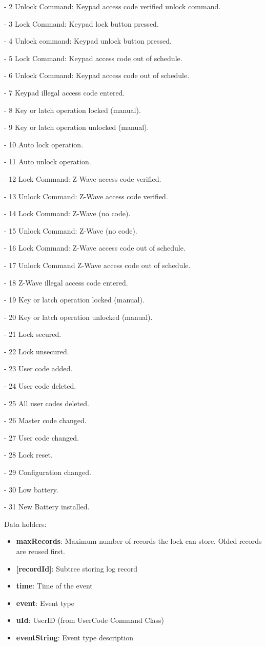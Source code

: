 - 2 Unlock Command: Keypad access code verified unlock command. 

- 3 Lock Command: Keypad lock button pressed. 

- 4 Unlock command: Keypad unlock button pressed. 

- 5 Lock Command: Keypad access code out of schedule. 

- 6 Unlock Command: Keypad access code out of schedule. 

- 7 Keypad illegal access code entered. 

- 8 Key or latch operation locked (manual). 

- 9 Key or latch operation unlocked (manual). 

- 10 Auto lock operation. 

- 11 Auto unlock operation. 

- 12 Lock Command: Z-Wave access code verified. 

- 13 Unlock Command: Z-Wave access code verified. 

- 14 Lock Command: Z-Wave (no code). 

- 15 Unlock Command: Z-Wave (no code). 

- 16 Lock Command: Z-Wave access code out of schedule. 

- 17 Unlock Command Z-Wave access code out of schedule. 

- 18 Z-Wave illegal access code entered. 

- 19 Key or latch operation locked (manual). 

- 20 Key or latch operation unlocked (manual). 

- 21 Lock secured. 

- 22 Lock unsecured. 

- 23 User code added. 

- 24 User code deleted. 

- 25 All user codes deleted. 

- 26 Master code changed. 

- 27 User code changed. 

- 28 Lock reset. 

- 29 Configuration changed. 

- 30 Low battery. 

- 31 New Battery installed.
\newline

\noindent
Data holders:

\begin{itemize}
\item \textbf{maxRecords}: Maximum number of records the lock can store. Olded records are reused first.
\item \textbf{[recordId]}: Subtree storing log record
\item \qquad\textbf{time}: Time of the event
\item \qquad\textbf{event}: Event type
\item \qquad\textbf{uId}: UserID (from UserCode Command Class)
\item \qquad\textbf{eventString}: Event type description
\end{itemize}


